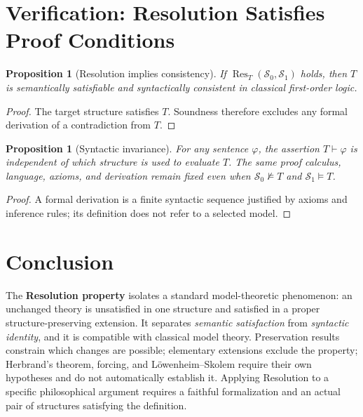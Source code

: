 \documentclass[11pt]{article}
\newtheorem{proposition}[definition]{Proposition}
\newcommand{\Sat}{\models}
\newcommand{\NSat}{\not\models}
\newcommand{\Res}{\operatorname{Res}}
\begin{document}
\section{Verification: Resolution Satisfies Proof Conditions}
\begin{proposition}[Resolution implies consistency]
If $\Res_T(\mathcal S_0,\mathcal S_1)$ holds, then $T$ is semantically satisfiable and syntactically consistent in classical first-order logic.
\end{proposition}
\begin{proof}
The target structure satisfies $T$. Soundness therefore excludes any formal derivation of a contradiction from $T$.
\end{proof}
\begin{proposition}[Syntactic invariance]
For any sentence $\varphi$, the assertion $T\vdash\varphi$ is independent of which structure is used to evaluate $T$. The same proof calculus, language, axioms, and derivation remain fixed even when $\mathcal S_0\NSat T$ and $\mathcal S_1\Sat T$.
\end{proposition}
\begin{proof}
A formal derivation is a finite syntactic sequence justified by axioms and inference rules; its definition does not refer to a selected model.
\end{proof}

\section{Conclusion}
The \textbf{Resolution property} isolates a standard model-theoretic phenomenon: an unchanged theory is unsatisfied in one structure and satisfied in a proper structure-preserving extension. It separates \emph{semantic satisfaction} from \emph{syntactic identity}, and it is compatible with classical model theory. Preservation results constrain which changes are possible; elementary extensions exclude the property; Herbrand's theorem, forcing, and L\"owenheim--Skolem require their own hypotheses and do not automatically establish it. Applying Resolution to a specific philosophical argument requires a faithful formalization and an actual pair of structures satisfying the definition.
\end{document}

